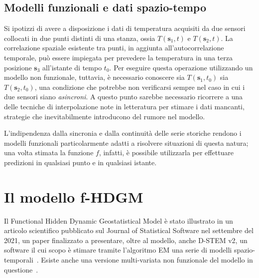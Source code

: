 \subsection[Modelli funzionali e dati spazio-tempo]{Modelli funzionali e dati spazio-tempo}
Si ipotizzi di avere a disposizione i dati di temperatura acquisiti da due sensori collocati in due punti distinti di una stanza, ossia $T(\mathbf{s}_1, t)$ e $T(\mathbf{s}_2, t)$. La correlazione spaziale esistente tra punti, in aggiunta all'autocorrelazione temporale, può essere impiegata per prevedere la temperatura in una terza posizione $\mathbf{s}_3$ all'istante di tempo $t_0$. Per eseguire questa operazione utilizzando un modello non funzionale, tuttavia, è necessario conoscere sia $T(\mathbf{s}_1, t_0)$ sia $T(\mathbf{s}_2, t_0)$, una condizione che potrebbe non verificarsi sempre nel caso in cui i due sensori siano \textit{asincroni}. A questo punto sarebbe necessario ricorrere a una delle tecniche di interpolazione note in letteratura per stimare i dati mancanti, strategie che inevitabilmente introducono del rumore nel modello. \par L'indipendenza dalla sincronia e dalla continuità delle serie storiche rendono i modelli funzionali particolarmente adatti a risolvere situazioni di questa natura; una volta stimata la funzione $f$, infatti, è possibile utilizzarla per effettuare predizioni in qualsiasi punto e in qualsiasi istante.

\section[Il modello f-HDGM]{Il modello f-HDGM}
Il Functional Hidden Dynamic Geostatistical Model è stato illustrato in un articolo scientifico pubblicato sul Journal of Statistical Software nel settembre del \num{2021}, un paper finalizzato a presentare, oltre al modello, anche D-STEM v2, un software il cui scopo è stimare tramite l'algoritmo EM una serie di modelli spazio-temporali~\citep{paper_f_HDGM}. Esiste anche una versione multi-variata non funzionale del modello in questione~\citep{paper_HDGM}.

